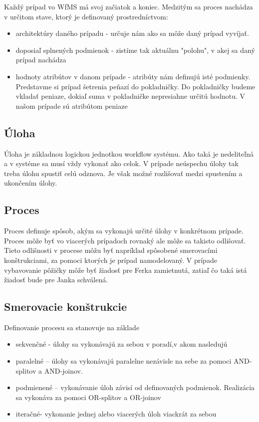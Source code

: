 


Každý prípad vo WfMS má svoj začiatok a koniec. Medzitým sa proces nachádza v určitom stave, ktorý je definovaný prostredníctvom:
\begin{itemize}
	\item architektúry daného prípadu - určuje nám ako sa môže daný prípad vyvíjať. 
	\item doposiaľ splnených podmienok - zistíme tak aktuálnu "polohu", v akej sa daný prípad nachádza 
	\item hodnoty atribútov v danom prípade - atribúty nám definujú isté podmienky. Predstavme si prípad šetrenia peňazí do pokladničky. Do pokladničky budeme vkladať peniaze, dokiaľ suma v pokladničke nepresiahne určitú hodnotu. V našom prípade sú atribútom peniaze
\end{itemize}

\subsection{Úloha}
Úloha je základnou logickou jednotkou workflow systému. Ako taká je nedeliteľná a v systéme sa musí vždy vykonať ako celok. V prípade neúspechu úlohy tak treba úlohu spustiť celú odznova. Je však možné rozlišovať medzi spustením a ukončením úlohy. 

\subsection{Proces}
Proces definuje spôsob, akým sa vykonajú určité úlohy v konkrétnom prípade. Proces môže byť vo viacerých prípadoch rovnaký ale môže sa takisto odlišovať. Tieto odlišnosti v procese môžu byť napríklad spôsobené smerovacími konštrukciami, za pomoci ktorých je prípad namodelovaný. V prípade vybavovanie pôžičky môže byť žiadosť pre Ferka zamietnutá, zatiaľ čo taká istá žiadosť bude pre Janka schválená.

\subsection{Smerovacie konštrukcie}
	Definovanie procesu sa stanovuje na základe
\begin{itemize}
	\item sekvenčné - úlohy sa vykonávajú za sebou v poradí,v akom nasledujú
	\item paralelné – úlohy sa vykonávajú paralelne nezávisle na sebe za pomoci AND-splitov a AND-joinov.
	\item podmienené – vykonávanie úloh závisí od definovaných podmienok. Realizácia sa vykonáva za pomoci OR-splitov a OR-joinov
	\item iteračné- vykonanie jednej alebo viacerých úloh viackrát za sebou
\end{itemize}

